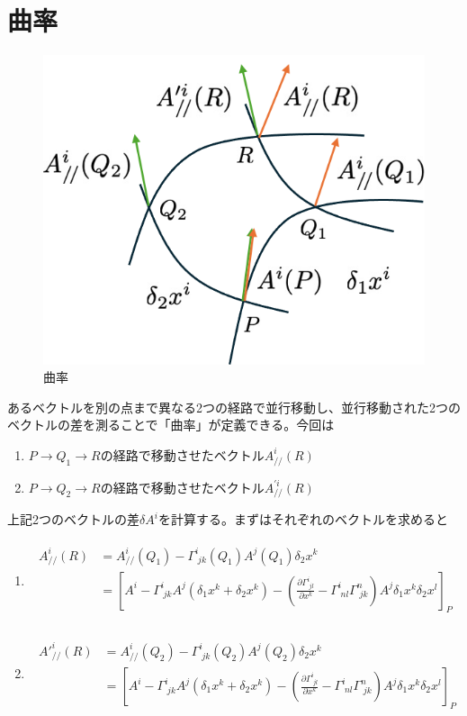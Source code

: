 \documentclass[dvipdfmx]{report} %
\begin{document}
\section{曲率}
\begin{figure}[H]
    \centering
    \includegraphics[width=0.5\columnwidth]{./images/0108/01.png}
    \caption{曲率}
    \label{}
\end{figure}
あるベクトルを別の点まで異なる2つの経路で並行移動し、並行移動された2つのベクトルの差を測ることで「曲率」が定義できる。今回は
\begin{enumerate}[(1)\,]
\item{$P \rightarrow Q_1 \rightarrow R$の経路で移動させたベクトル$A^i_{/\!/}(R)$}
\item{$P \rightarrow Q_2 \rightarrow R$の経路で移動させたベクトル$A^{'i}_{/\!/}(R)$}
\end{enumerate}
上記2つのベクトルの差$\delta A^i$を計算する。まずはそれぞれのベクトルを求めると
\begin{enumerate}[(1)\,]
\item{}
\begin{eqnarray*}
\begin{split}
	A^{i}_{/\!/}(R) 
	&= A^{i}_{/\!/}(Q_1) - \Gamma^{i}_{\;jk}(Q_1)A^{j}(Q_1)\delta_2 x^k \\ 
	&= \left[
		A^i - \Gamma^{i}_{\;jk}A^j( \delta_1 x^k + \delta_2 x^k )
		- \left( \frac{\partial \Gamma^{i}_{\;jl}}{\partial x^k} 
		- \Gamma^{i}_{\;nl}\Gamma^{n}_{\;jk} \right) A^j \delta_1 x^k \delta_2 x^l 
	\right]_P\\
\end{split}
\end{eqnarray*}

\item{}
\begin{eqnarray*}
\begin{split}
	A'^{i}_{/\!/}(R)
	&= A^{i}_{/\!/}(Q_2) - \Gamma^{i}_{\;jk}(Q_2)A^{j}(Q_2)\delta_2 x^k \\ 		&= \left[ 
		A^i - \Gamma^{i}_{\;jk}A^j( \delta_1 x^k + \delta_2 x^k )
		- \left( \frac{\partial \Gamma^{i}_{\;jl}}{\partial x^k}
		- \Gamma^{i}_{\;nl}\Gamma^{n}_{\;jk} \right) A^j \delta_1 x^k \delta_2 x^l 
	\right]_P
\end{split}
\end{eqnarray*}
\end{enumerate}
\end{document}
